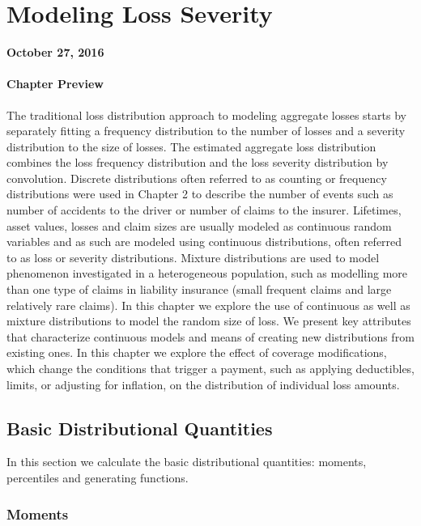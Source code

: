\documentclass[]{book}
\begin{document}
\chapter{Modeling Loss Severity}\label{modeling-loss-severity}

\textbf{October 27, 2016}

\subsubsection*{Chapter Preview}\label{chapter-preview}

The traditional loss distribution approach to modeling aggregate losses
starts by separately fitting a frequency distribution to the number of
losses and a severity distribution to the size of losses. The estimated
aggregate loss distribution combines the loss frequency distribution and
the loss severity distribution by convolution. Discrete distributions
often referred to as counting or frequency distributions were used in
Chapter 2 to describe the number of events such as number of accidents
to the driver or number of claims to the insurer. Lifetimes, asset
values, losses and claim sizes are usually modeled as continuous random
variables and as such are modeled using continuous distributions, often
referred to as loss or severity distributions. Mixture distributions are
used to model phenomenon investigated in a heterogeneous population,
such as modelling more than one type of claims in liability insurance
(small frequent claims and large relatively rare claims). In this
chapter we explore the use of continuous as well as mixture
distributions to model the random size of loss. We present key
attributes that characterize continuous models and means of creating new
distributions from existing ones. In this chapter we explore the effect
of coverage modifications, which change the conditions that trigger a
payment, such as applying deductibles, limits, or adjusting for
inflation, on the distribution of individual loss amounts.

\section{Basic Distributional Quantities}\label{BasicQuantities}

In this section we calculate the basic distributional quantities:
moments, percentiles and generating functions.

\subsection{Moments}\label{moments}
\end{document}

